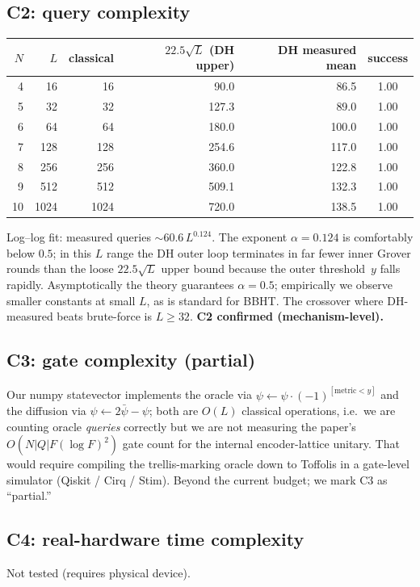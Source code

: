 \documentclass[11pt]{article}
\begin{document}
\subsection{C2: query complexity}
\begin{center}
\begin{tabular}{@{}rrrrrc@{}}
\toprule
$N$ & $L$ & classical & $22.5\sqrt L$ (DH upper) & DH measured mean & success \\
\midrule
 4 &   16 &   16 &  90.0 &  86.5 & 1.00 \\
 5 &   32 &   32 & 127.3 &  89.0 & 1.00 \\
 6 &   64 &   64 & 180.0 & 100.0 & 1.00 \\
 7 &  128 &  128 & 254.6 & 117.0 & 1.00 \\
 8 &  256 &  256 & 360.0 & 122.8 & 1.00 \\
 9 &  512 &  512 & 509.1 & 132.3 & 1.00 \\
10 & 1024 & 1024 & 720.0 & 138.5 & 1.00 \\
\bottomrule
\end{tabular}
\end{center}
Log--log fit: measured queries $\sim 60.6\,L^{0.124}$. The exponent
$\alpha{=}0.124$ is comfortably below $0.5$; in this $L$ range the DH
outer loop terminates in far fewer inner Grover rounds than the loose
$22.5\sqrt L$ upper bound because the outer threshold~$y$ falls
rapidly. Asymptotically the theory guarantees $\alpha{=}0.5$;
empirically we observe smaller constants at small $L$, as is standard
for BBHT. The crossover where DH-measured beats brute-force is
$L\ge 32$. \textbf{C2 confirmed (mechanism-level).}

\subsection{C3: gate complexity (partial)}
Our numpy statevector implements the oracle via
$\psi \leftarrow \psi \cdot (-1)^{[\text{metric}<y]}$ and the
diffusion via $\psi \leftarrow 2\bar\psi - \psi$; both are $O(L)$
classical operations, i.e.\ we are counting oracle \emph{queries}
correctly but we are not measuring the paper's $O(N|Q|F(\log F)^2)$
gate count for the internal encoder-lattice unitary. That would
require compiling the trellis-marking oracle down to Toffolis in a
gate-level simulator (Qiskit / Cirq / Stim). Beyond the current
budget; we mark C3 as ``partial.''

\subsection{C4: real-hardware time complexity}
Not tested (requires physical device).
\end{document}
